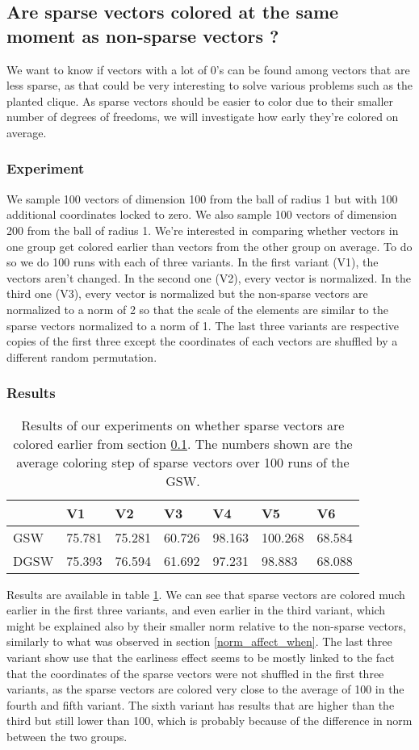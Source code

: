 \documentclass[12pt]{article}
\begin{document}
\subsection{Are sparse vectors colored at the same moment as non-sparse vectors ?}\label{smaller_dimensionality}
We want to know if vectors with a lot of 0's can be found among vectors that are less sparse, as that could be very interesting to solve various problems such as the planted clique. As sparse vectors should be easier to color due to their smaller number of degrees of freedoms, we will investigate how early they're colored on average.

\subsubsection{Experiment}
We sample 100 vectors of dimension 100 from the ball of radius 1 but with 100 additional coordinates locked to zero. We also sample 100 vectors of dimension 200 from the ball of radius 1. We're interested in comparing whether vectors in one group get colored earlier than vectors from the other group on average. To do so we do 100 runs with each of three variants. In the first variant (V1), the vectors aren't changed. In the second one (V2), every vector is normalized. In the third one (V3), every vector is normalized but the non-sparse vectors are normalized to a norm of 2 so that the scale of the elements are similar to the sparse vectors normalized to a norm of 1. The last three variants are respective copies of the first three except the coordinates of each vectors are shuffled by a different random permutation.

\subsubsection{Results}
\begin{table}[h!]
\centering
\caption{Results of our experiments on whether sparse vectors are colored earlier from section \ref{smaller_dimensionality}. The numbers shown are the average coloring step of sparse vectors over 100 runs of the GSW.}
\begin{tabular}{l|llllll}
 &V1&V2&V3&V4&V5&V6\\
\hline
GSW&75.781&75.281&60.726&98.163&100.268&68.584\\
DGSW&75.393&76.594&61.692&97.231&98.883&68.088
\end{tabular}
\label{sparse_early_res}\end{table}
Results are available in table \ref{sparse_early_res}. We can see that sparse vectors are colored much earlier in the first three variants, and even earlier in the third variant, which might be explained also by their smaller norm relative to the non-sparse vectors, similarly to what was observed in section \ref{norm_affect_when}. The last three variant show use that the earliness effect seems to be mostly linked to the fact that the coordinates of the sparse vectors were not shuffled in the first three variants, as the sparse vectors are colored very close to the average of 100 in the fourth and fifth variant. The sixth variant has results that are higher than the third but still lower than 100, which is probably because of the difference in norm between the two groups.
\end{document}
